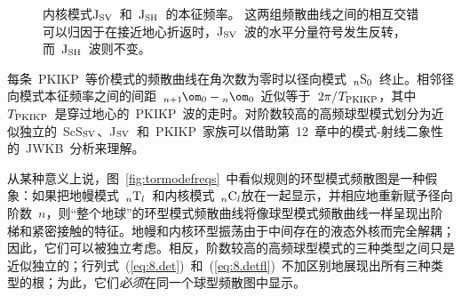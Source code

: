 {\begin{figure}
\begin{center}
\end{center}
\caption[innercoremodes]{\label{fig:incoremodes}
内核模式${\rm J}_{\rm SV}$~和~${\rm J}_{\rm SH}$~的本征频率。
%
%
这两组频散曲线之间的相互交错可以归因于在接近地心折返时，${\rm J}_{\rm SV}$~波的水平分量符号发生反转，而~${\rm J}_{\rm SH}$~波则不变。
}
\end{figure}
每条~PKIKP~等价模式的频散曲线在角次数为零时以径向模式~${}_n{\rm S}_0$~终止。相邻径向模式本征频率之间的间距~${}_{n+1\hspace{-0.01in}}\om_0
-{}_n\om_0$~近似等于~$2\pi/\hspace{0.2 mm}T_{\rm PKIKP}$，其中~$T_{\rm PKIKP}$~是穿过地心的~PKIKP~波的走时。对阶数较高的高频球型模式划分为近似独立的~ScS${}_{\rm SV}$、J${}_{\rm SV}$~和~PKIKP~家族可以借助第~12~章中的模式-射线二象性的~JWKB~分析来理解。

从某种意义上说，图~\ref{fig:tormodefreqs}~中看似规则的环型模式频散图是一种假象：如果把地幔模式~${}_n{\rm T}_l$~和内核模式~${}_n{\rm C}_l$放在一起显示，并相应地重新赋予径向阶数~$n$，则“整个地球”的环型模式频散曲线将像球型模式频散曲线一样呈现出阶梯和紧密接触的特征。地幔和内核环型振荡由于中间存在的液态外核而完全解耦；因此，它们可以被独立考虑。相反，阶数较高的高频球型模式的三种类型之间只是近似独立的；行列式~(\ref{eq:8.det})~和~(\ref{eq:8.detfl})~不加区别地展现出所有三种类型的根；为此，它们{\em 必须\/}在同一个球型频散图中显示。

}
